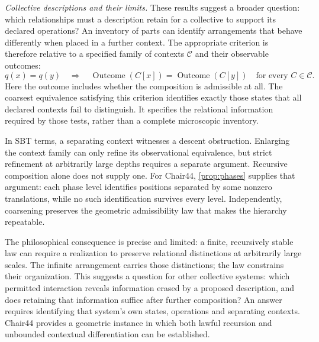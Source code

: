 \emph{Collective descriptions and their limits.}
These results suggest a broader question: which relationships must a description
retain for a collective to support its declared operations? An inventory of parts
can identify arrangements that behave differently when placed in a further context.
The appropriate criterion is therefore relative to a specified family of contexts
$\mathcal C$ and their observable outcomes:
\[
 q(x)=q(y)\quad\Longrightarrow\quad
 \operatorname{Outcome}(C[x])=\operatorname{Outcome}(C[y])
 \quad\text{for every }C\in\mathcal C.
\]
Here the outcome includes whether the composition is admissible at all. The
coarsest equivalence satisfying this criterion identifies exactly those states
that all declared contexts fail to distinguish. It specifies the relational
information required by those tests, rather than a complete microscopic inventory.

In SBT terms, a separating context witnesses a descent obstruction. Enlarging the
context family can only refine its observational equivalence, but strict refinement
at arbitrarily large depths requires a separate argument. Recursive composition
alone does not supply one. For Chair44, \cref{prop:phases} supplies that argument:
each phase level identifies positions separated by some nonzero translations,
while no such identification survives every level. Independently, coarsening
preserves the geometric admissibility law that makes the hierarchy repeatable.

The philosophical consequence is precise and limited: a finite, recursively stable
law can require a realization to preserve relational distinctions at arbitrarily
large scales. The infinite arrangement carries those distinctions; the law
constrains their organization. This suggests a question for other collective
systems: which permitted interaction reveals information erased by a proposed
description, and does retaining that information suffice after further composition?
An answer requires identifying that system's own states, operations and separating
contexts. Chair44 provides a geometric instance in which both lawful recursion and
unbounded contextual differentiation can be established.
